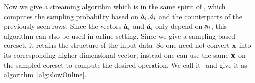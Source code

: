 Now we give a streaming algorithm which is in the same spirit of \online, which computes the sampling probability based on $\grave{\mathbf{a}}_{i}, \acute{\mathbf{a}}_{i}$ and the counterparts of the previously seen rows. Since the vectors $\grave{\mathbf{a}}_{i}$ and $\acute{\mathbf{a}}_{i}$ only depend on $\mathbf{a}_{i}$, this algorithm can also be used in online setting. 
Since we give a sampling based coreset, it retains the structure of the input data. So one need not convert $\mathbf{x}$ into its corresponding higher dimensional vector, instead one can use the same $\mathbf{x}$ on the sampled coreset to compute the desired operation. We call it ~and give it as algorithm~\ref{alg:slowOnline}.
% 
